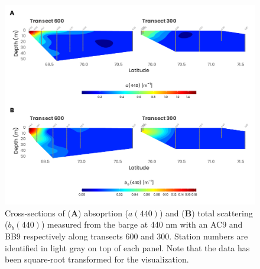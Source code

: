 \documentclass[essd, manuscript]{copernicus}
\begin{document}
\clearpage

\begin{figure}[H]
    \centering
    \includegraphics[scale = 0.85]{../../../graphs/fig06.pdf}
    \caption{Cross-sections of (\textbf{A}) absoprtion ($a(440)$) and (\textbf{B}) total scattering ($b_b(440)$) measured from the barge at 440 nm with an AC9 and BB9 respectively along transects 600 and 300. Station numbers are identified in light gray on top of each panel. Note that the data has been square-root transformed for the visualization.}
\end{figure}

\clearpage
\end{document}
